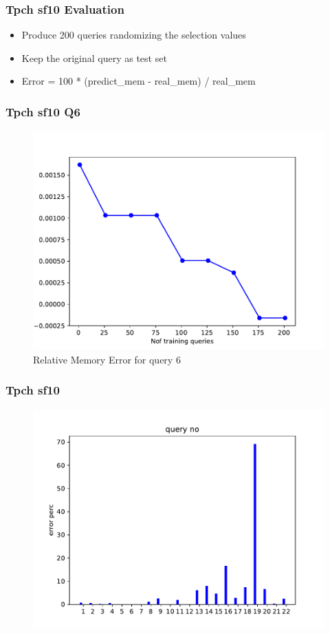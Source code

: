 \begin{frame}[fragile]
\frametitle{Tpch sf10 Evaluation}
\begin{block}{}
\begin{itemize}
	\item Produce 200 queries randomizing the selection values
	\item Keep the original query as test set
	\item Error = 100 * (predict\_mem - real\_mem) / real\_mem
\end{itemize}
\end{block}
\end{frame}

\begin{frame}[fragile]
	\frametitle{Tpch sf10 Q6}
  \begin{figure}[t]
    \centering
    \includegraphics[width=1.0\textwidth]{../figs/tpch10/tpch10_q06_memerror.pdf}
		\caption{Relative Memory Error for query 6}
  \end{figure}
\end{frame}


\begin{frame}[fragile]
	\frametitle{Tpch sf10}
  \begin{figure}[t]
    \centering
    \includegraphics[width=1.0\textwidth]{../figs/tpch10/mem_error_1-23.pdf}
  \end{figure}
\end{frame}

